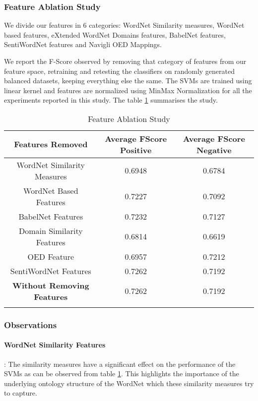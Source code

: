 \subsubsection{Feature Ablation Study}
We divide our features in 6 categories: WordNet Similarity measures, WordNet based features, eXtended WordNet Domains features, BabelNet features, SentiWordNet features and Navigli OED Mappings. 

We report the F-Score observed by removing that category of features from our feature space, retraining and retesting the classifiers on randomly generated balanced datasets, keeping everything else the same. The SVMs are trained using linear kernel and features are normalized using MinMax Normalization for all the experiments reported in this study. The table \ref{tab:nounEvalFeatureAblation} summarises the study.

\begin{center}
\begin{longtable}{| c | c | c |}  
\hline
\textbf{Features Removed} & \textbf{Average FScore Positive} & \textbf{Average FScore Negative} \\ \hline
WordNet Similarity Measures & 0.6948 & 0.6784 \\ \hline
WordNet Based Features & 0.7227 & 0.7092 \\ \hline
BabelNet Features & 0.7232 & 0.7127 \\ \hline
Domain Similarity Features & 0.6814 & 0.6619 \\ \hline
OED Feature & 0.6957 & 0.7212 \\ \hline
SentiWordNet Features & 0.7262 & 0.7192 \\ \hline
\hline
\textbf{Without Removing Features} & 0.7262 & 0.7192 \\ \hline
\caption{Feature Ablation Study}
\label{tab:nounEvalFeatureAblation}
\end{longtable}
\end{center}

\subsubsection{Observations}

\paragraph{WordNet Similarity Features}: 
The similarity measures have a significant effect on the performance of the SVMs as can be observed from table \ref{tab:nounEvalFeatureAblation}. This highlights the importance of the underlying ontology structure of the WordNet which these similarity measures try to capture.

